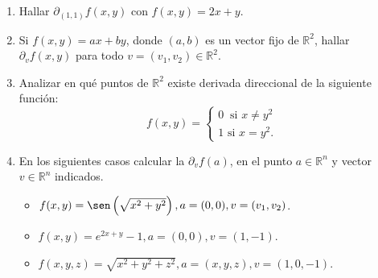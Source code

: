 \documentclass[11pt]{book}
\newcommand{\R}{\mathbb{R}}
\theoremstyle{definicion}
\theoremstyle{teorema}
\theoremstyle{ejemplo}
\begin{document}
\begin{enumerate}
\begin{itemize}
\item[c)] $f(x,y)=\left\{ 
\begin{array}{ccc}
\frac{x^{2}y^{3}}{x^{2}+y^{2}} & \text{si} & \left( x,y\right) \neq \left(
0,0\right)  \\ 
0 & \text{si} & \left( x,y\right) =\left( 0,0\right) 
\end{array}%
\right. $ en $\left( 0,0\right) $ y $\left( 1,2\right) $
\item[d)] $f(x,y)=\left\{ 
\begin{array}{ccc}
xy & \text{si} & x\leq y \\ 
x^{2} & \text{si} & x>y%
\end{array}%
\right. $ en $\left(1,1\right)$ y $\left( 1,2\right) $
\end{itemize}


\item Hallar $\partial_{(1,1)}f(x,y)$ con $f(x,y)=2x+y$.

  \item Si $f(x,y)=ax+by$, donde $(a,b)$ es un vector fijo de $\R^2$,
hallar  $\partial_v f(x,y)$ para todo $v=(v_1,v_2)\in\R^2$. 

\smallskip
\item Analizar en qué puntos de $\R^2$ existe derivada direccional de la siguiente función:
   \[f(x,y)=\left\{\begin{array}{l}
                           0\ \mbox{ si }x\neq y^2\\
                           1\mbox{ si } x=y^2.\end{array}\right.\]

\item En los siguientes casos calcular la $\partial_v f(a)$, en el punto $a\in\R^n$ y vector $v\in\R^n$ indicados. 
\begin{itemize}
\item[a)] $f(x,y)=\sen \left( \sqrt{x^{2}+y^{2}}\right), a=(0,0), v=(v_1,v_2)$.
\item[b)]  $f(x,y)=e^{2x+y}-1, a=(0,0), v=(1,-1)$.
\item[c)]  $f(x,y,z)=\sqrt{x^2+y^2+z^2}, a=(x,y,z), v=(1,0,-1)$.
\end{itemize}



\end{enumerate}
\end{document}
